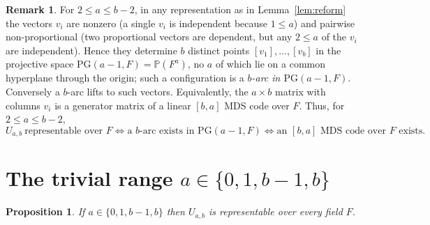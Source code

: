 \documentclass{amsart}
\newtheorem{proposition}{Proposition}
\theoremstyle{definition}
\newtheorem{remark}{Remark}
\begin{document}
\begin{remark}\label{rem:projective}
For $2\le a\le b-2$, in any representation as in Lemma~\ref{lem:reform} the
vectors $v_i$ are nonzero (a single $v_i$ is independent because $1\le a$) and
pairwise non-proportional (two proportional vectors are dependent, but any
$2\le a$ of the $v_i$ are independent). Hence they determine $b$ distinct points
$[v_1],\dots,[v_b]$ in the projective space $\mathrm{PG}(a-1,F)=\mathbb P(F^a)$,
no $a$ of which lie on a common hyperplane through the origin; such a configuration
is a \emph{$b$-arc in $\mathrm{PG}(a-1,F)$}. Conversely a $b$-arc lifts to such
vectors. Equivalently, the $a\times b$ matrix with columns $v_i$ is a generator
matrix of a linear $[b,a]$ MDS code over $F$. Thus, for $2\le a\le b-2$,
\[
U_{a,b}\ \text{representable over }F
\iff \text{a }b\text{-arc exists in }\mathrm{PG}(a-1,F)
\iff \text{an }[b,a]\text{ MDS code over }F\text{ exists.}
\]
\end{remark}

\section{The trivial range $a\in\{0,1,b-1,b\}$}

\begin{proposition}\label{prop:trivial}
If $a\in\{0,1,b-1,b\}$ then $U_{a,b}$ is representable over every field $F$.
\end{proposition}
\end{document}
